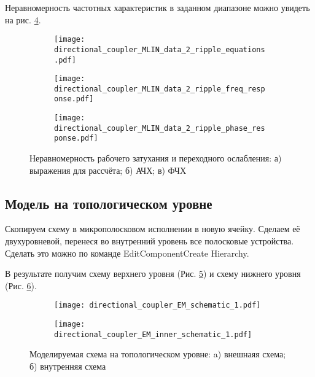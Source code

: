 Неравномерность частотных характеристик в заданном диапазоне можно увидеть на рис. \ref{fig:directional_coupler_MLIN_data_2_response_ripple}.

\begin{figure}[!ht]
    \centering
    \begin{subfigure}[b]{0.4\textwidth}
        \centering
        \texttt{[image: directional\_coupler\_MLIN\_data\_2\_ripple\_equations.pdf]}
        \caption{}
        \label{fig:directional_coupler_MLIN_data_2_ripple_equations}
    \end{subfigure}
    \vfill
    \begin{subfigure}[b]{0.40\textwidth}
        \centering
        \texttt{[image: directional\_coupler\_MLIN\_data\_2\_ripple\_freq\_response.pdf]}
        \caption{}
        \label{fig:directional_coupler_MLIN_data_2_ripple_freq_response}
    \end{subfigure}
    \hfill
    \begin{subfigure}[b]{0.50\textwidth}
        \centering
        \texttt{[image: directional\_coupler\_MLIN\_data\_2\_ripple\_phase\_response.pdf]}
        \caption{}
        \label{fig:directional_coupler_MLIN_data_2_ripple_phase_response}
    \end{subfigure}
    \caption{
        Неравномерность рабочего затухания и переходного ослабления:
        а) выражения для рассчёта;
        б) АЧХ;
        в) ФЧХ
    }
    \label{fig:directional_coupler_MLIN_data_2_response_ripple}
\end{figure}

\subsection{Модель на топологическом уровне}

Скопируем схему в микрополосковом исполнении в новую ячейку. Сделаем её двухуровневой, перенеся во внутренний уровень все полосковые устройства. Сделать это можно по команде Edit\textrightarrow Component\textrightarrow Create Hierarchy.

В результате получим схему верхнего уровня (Рис. \ref{fig:directional_coupler_EM_schematic}) и схему нижнего уровня (Рис. \ref{fig:directional_coupler_EM_inner_schematic}).

\begin{figure}[!ht]
    \centering
    \begin{subfigure}[b]{0.45\textwidth}
        \centering
        \texttt{[image: directional\_coupler\_EM\_schematic\_1.pdf]}
        \caption{}
        \label{fig:directional_coupler_EM_schematic}
    \end{subfigure}
    \hfill
    \begin{subfigure}[b]{0.45\textwidth}
        \centering
        \texttt{[image: directional\_coupler\_EM\_inner\_schematic\_1.pdf]}
        \caption{}
        \label{fig:directional_coupler_EM_inner_schematic}
    \end{subfigure}
    \caption{
        Моделируемая схема на топологическом уровне:
        a) внешнаяя схема;
        б) внутренняя схема
    }
    \label{fig:directional_coupler_EM_schematics}
\end{figure}

